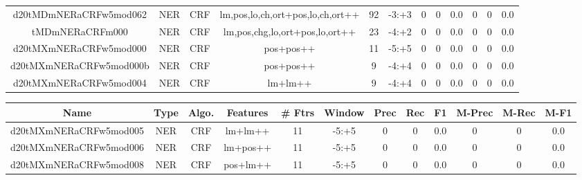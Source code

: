 \documentclass[a4paper]{article}
\begin{document}
\begin{landscape}
\begin{center}
\begin{tabular}{ |c|c|c|c|c|c|c|c|c|c|c|c|}
 
 	
 	\small{ d20tMDmNERaCRFw5mod062 } & \small{ NER} & \small{  CRF }  & lm,pos,lo,ch,ort+pos,lo,ch,ort++  &  92 &  \small{  -3:+3 }  &  0 & 0 & 0.0  &  0 & 0 & 0.0 \\
 	

 
 	
 	\small{ tMDmNERaCRFm000 } & \small{ NER} & \small{  CRF }  & lm,pos,chg,lo,ort+pos,lo,ort++  &  23 &  \small{  -4:+2 }  &  0 & 0 & 0.0  &  0 & 0 & 0.0 \\
 	

 
 	
 	\small{ d20tMXmNERaCRFw5mod000 } & \small{ NER} & \small{  CRF }  & pos+pos++  &  11 &  \small{  -5:+5 }  &  0 & 0 & 0.0  &  0 & 0 & 0.0 \\
 	

 
 	
 	\small{ d20tMXmNERaCRFw5mod000b } & \small{ NER} & \small{  CRF }  & pos+pos++  &  9 &  \small{  -4:+4 }  &  0 & 0 & 0.0  &  0 & 0 & 0.0 \\
 	

 
 	
 	\small{ d20tMXmNERaCRFw5mod004 } & \small{ NER} & \small{  CRF }  & lm+lm++  &  9 &  \small{  -4:+4 }  &  0 & 0 & 0.0  &  0 & 0 & 0.0 \\
 	
 \hline
\end{tabular}
\end{center}




\begin{center}
\begin{tabular}{ |c|c|c|c|c|c|c|c|c|c|c|c|} 
 \hline
 	Name & Type & Algo. & Features & \# Ftrs & Window & Prec & Rec & F1 & M-Prec & M-Rec & M-F1\\
 \hline

 	

 
 	
 	\small{ d20tMXmNERaCRFw5mod005 } & \small{ NER} & \small{  CRF }  & lm+lm++  &  11 &  \small{  -5:+5 }  &  0 & 0 & 0.0  &  0 & 0 & 0.0 \\
 	

 
 	
 	\small{ d20tMXmNERaCRFw5mod006 } & \small{ NER} & \small{  CRF }  & lm+pos++  &  11 &  \small{  -5:+5 }  &  0 & 0 & 0.0  &  0 & 0 & 0.0 \\
 	

 
 	
 	\small{ d20tMXmNERaCRFw5mod008 } & \small{ NER} & \small{  CRF }  & pos+lm++  &  11 &  \small{  -5:+5 }  &  0 & 0 & 0.0  &  0 & 0 & 0.0 \\
 	


\end{tabular}
\end{center}
\end{landscape}
\end{document}
